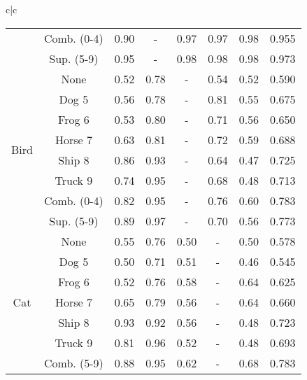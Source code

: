 \documentclass[acmtog, nonacm]{acmart}
\begin{document}
\begin{tabular}{c|c}
\begin{tabular}{@{}c|c|ccccc|c@{}}
                       & Comb. (0-4)               & 0.90  & -    & 0.97 & 0.97 & 0.98 & 0.955                \\
                       & Sup. (5-9)                & 0.95  & -    & 0.98 & 0.98 & 0.98 & 0.973                \\
                       \midrule
\multirow{8}{*}{Bird}  & None                      & 0.52  & 0.78 & -    & 0.54 & 0.52 & 0.590                \\
                       & Dog 5                     & 0.56  & 0.78 & -    & 0.81 & 0.55 & 0.675                \\
                       & Frog 6                    & 0.53  & 0.80 & -    & 0.71 & 0.56 & 0.650                \\
                       & Horse 7                   & 0.63  & 0.81 & -    & 0.72 & 0.59 & 0.688                \\
                       & Ship 8                    & 0.86  & 0.93 & -    & 0.64 & 0.47 & 0.725                \\
                       & Truck 9                   & 0.74  & 0.95 & -    & 0.68 & 0.48 & 0.713                \\
                       & Comb. (0-4)               & 0.82  & 0.95 & -    & 0.76 & 0.60 & 0.783                \\
                       & Sup. (5-9)                & 0.89  & 0.97 & -    & 0.70 & 0.56 & 0.773                \\
                       \midrule
\multirow{8}{*}{Cat}   & None                      & 0.55  & 0.76 & 0.50 & -    & 0.50 & 0.578                \\
                       & Dog 5                     & 0.50  & 0.71 & 0.51 & -    & 0.46 & 0.545                \\
                       & Frog 6                    & 0.52  & 0.76 & 0.58 & -    & 0.64 & 0.625                \\
                       & Horse 7                   & 0.65  & 0.79 & 0.56 & -    & 0.64 & 0.660                \\
                       & Ship 8                    & 0.93  & 0.92 & 0.56 & -    & 0.48 & 0.723                \\
                       & Truck 9                   & 0.81  & 0.96 & 0.52 & -    & 0.48 & 0.693                \\
                       & Comb. (5-9)               & 0.88  & 0.95 & 0.62 & -    & 0.68 & 0.783                \\

\end{tabular}
\end{tabular}
\end{document}
